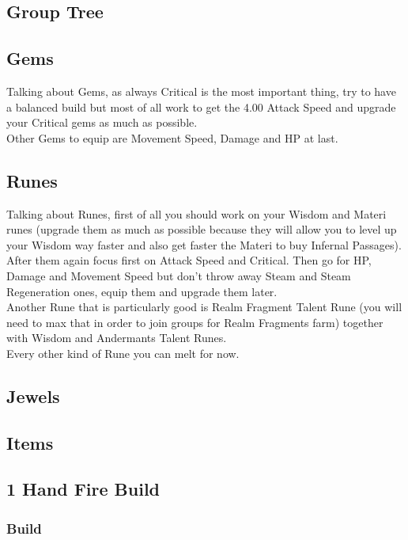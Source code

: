\documentclass[12pt]{article}
\begin{document}
\subsection{Group Tree}


\subsection{Gems}
Talking about Gems, as always Critical is the most important thing, try to have a balanced build but most of all work to get the 4.00 Attack Speed and upgrade your Critical gems as much as possible. \\
Other Gems to equip are Movement Speed, Damage and HP at last.

\subsection{Runes}
Talking about Runes, first of all you should work on your Wisdom and Materi runes (upgrade them as much as possible because they will allow you to level up your Wisdom way faster and also get faster the Materi to buy Infernal Passages). \\
After them again focus first on Attack Speed and Critical. Then go for HP, Damage and Movement Speed but don't throw away Steam and Steam Regeneration ones, equip them and upgrade them later. \\
Another Rune that is particularly good is Realm Fragment Talent Rune (you will need to max that in order to join groups for Realm Fragments farm) together with Wisdom and Andermants Talent Runes. \\
Every other kind of Rune you can melt for now.

\subsection{Jewels}

\subsection{Items}


\subsection{1 Hand Fire Build}
\subsubsection{Build}
\end{document}
